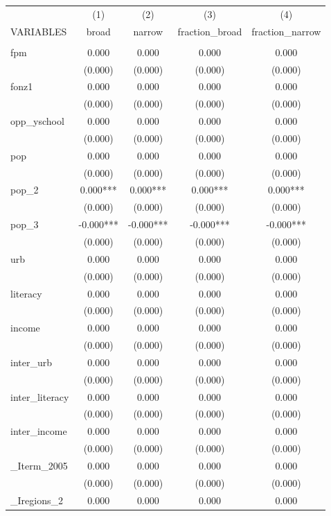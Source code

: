 \documentclass[]{article}
\begin{document}
\begin{tabular}{lcccc} \hline
 & (1) & (2) & (3) & (4) \\
VARIABLES & broad & narrow & fraction\_broad & fraction\_narrow \\ \hline
 &  &  &  &  \\
fpm & 0.000 & 0.000 & 0.000 & 0.000 \\
 & (0.000) & (0.000) & (0.000) & (0.000) \\
fonz1 & 0.000 & 0.000 & 0.000 & 0.000 \\
 & (0.000) & (0.000) & (0.000) & (0.000) \\
opp\_yschool & 0.000 & 0.000 & 0.000 & 0.000 \\
 & (0.000) & (0.000) & (0.000) & (0.000) \\
pop & 0.000 & 0.000 & 0.000 & 0.000 \\
 & (0.000) & (0.000) & (0.000) & (0.000) \\
pop\_2 & 0.000*** & 0.000*** & 0.000*** & 0.000*** \\
 & (0.000) & (0.000) & (0.000) & (0.000) \\
pop\_3 & -0.000*** & -0.000*** & -0.000*** & -0.000*** \\
 & (0.000) & (0.000) & (0.000) & (0.000) \\
urb & 0.000 & 0.000 & 0.000 & 0.000 \\
 & (0.000) & (0.000) & (0.000) & (0.000) \\
literacy & 0.000 & 0.000 & 0.000 & 0.000 \\
 & (0.000) & (0.000) & (0.000) & (0.000) \\
income & 0.000 & 0.000 & 0.000 & 0.000 \\
 & (0.000) & (0.000) & (0.000) & (0.000) \\
inter\_urb & 0.000 & 0.000 & 0.000 & 0.000 \\
 & (0.000) & (0.000) & (0.000) & (0.000) \\
inter\_literacy & 0.000 & 0.000 & 0.000 & 0.000 \\
 & (0.000) & (0.000) & (0.000) & (0.000) \\
inter\_income & 0.000 & 0.000 & 0.000 & 0.000 \\
 & (0.000) & (0.000) & (0.000) & (0.000) \\
\_Iterm\_2005 & 0.000 & 0.000 & 0.000 & 0.000 \\
 & (0.000) & (0.000) & (0.000) & (0.000) \\
\_Iregions\_2 & 0.000 & 0.000 & 0.000 & 0.000 \\

\end{tabular}
\end{document}
